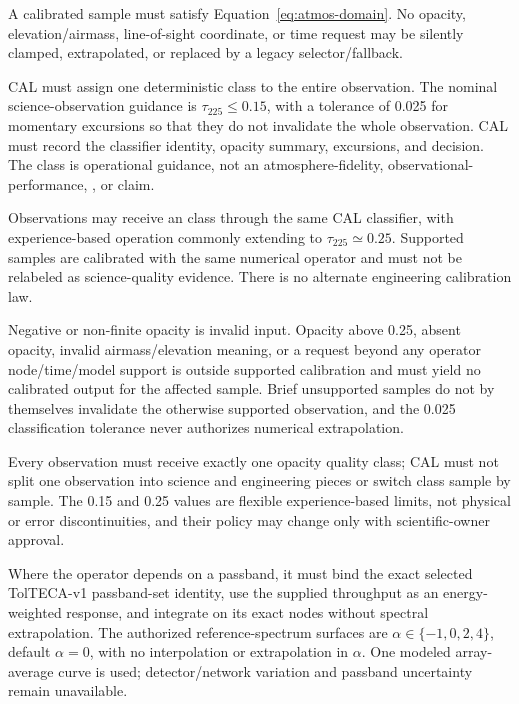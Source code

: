 \begin{description}[style=nextline]
\item[\Req{026}: domain intersection.]
  A calibrated sample must satisfy Equation~\eqref{eq:atmos-domain}. No
  opacity, elevation/airmass, line-of-sight coordinate, or time request may be
  silently clamped, extrapolated, or replaced by a legacy selector/fallback.

\item[\Req{027}: science-qualification eligibility policy.]
  CAL must assign one deterministic class to the entire observation. The
  nominal science-observation guidance is \(\tau_{225}\leq0.15\), with a
  tolerance of 0.025 for momentary excursions so that they do not invalidate
  the whole observation. CAL must record the classifier identity, opacity
  summary, excursions, and decision. The class is operational guidance, not
  an atmosphere-fidelity, observational-performance, ,
  or  claim.

\item[\Req{028}]
   Observations may receive an
   class through the same CAL classifier, with
  experience-based operation commonly extending to \(\tau_{225}\simeq0.25\).
  Supported samples are calibrated with the same numerical operator and must
  not be relabeled as science-quality evidence. There is no alternate
  engineering calibration law.

\item[\Req{029}: invalid and outside-supported opacity.]
  Negative or non-finite opacity is invalid input. Opacity above 0.25, absent
  opacity, invalid airmass/elevation meaning, or a request beyond any operator
  node/time/model support is outside supported calibration and must yield no
  calibrated output for the affected sample. Brief unsupported samples do not
  by themselves invalidate the otherwise supported observation, and the
  0.025 classification tolerance never authorizes numerical extrapolation.

\item[\Req{030}: coherent quality state.]
  Every observation must receive exactly one opacity quality class; CAL must
  not split one observation into science and engineering pieces or switch
  class sample by sample. The 0.15 and 0.25 values are flexible
  experience-based limits, not physical or error discontinuities, and their
  policy may change only with scientific-owner approval.

\item[\Req{031}: passband limits.]
  Where the operator depends on a passband, it must bind the exact selected
  TolTECA-v1 passband-set identity, use the supplied throughput as an
  energy-weighted response, and integrate on its exact nodes without spectral
  extrapolation. The authorized reference-spectrum surfaces are
  \(\alpha\in\{-1,0,2,4\}\), default \(\alpha=0\), with no interpolation or
  extrapolation in \(\alpha\). One modeled array-average curve is used;
  detector/network variation and passband uncertainty remain unavailable.
\end{description}

